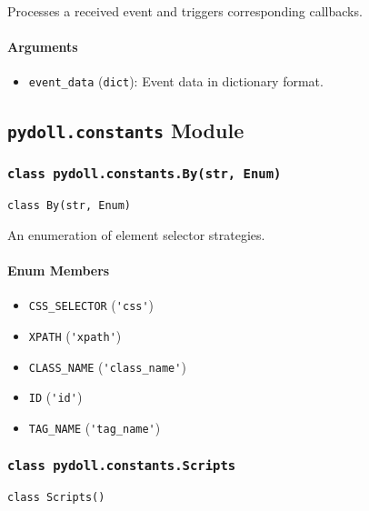 \documentclass{article}
\begin{document}
\noindent Processes a received event and triggers corresponding callbacks.

\paragraph{Arguments}

\begin{itemize}
    \item \lstinline[style=pythonstyle]|event_data| (\lstinline[style=pythonstyle]|dict|): Event data in dictionary format.
\end{itemize}

\hrulefill

\subsection*{\texttt{pydoll.constants} Module}

\subsubsection*{\texttt{class pydoll.constants.By(str, Enum)}}
\noindent\texttt{class By(str, Enum)}

\noindent An enumeration of element selector strategies.

\paragraph{Enum Members}

\begin{itemize}
    \item \lstinline[style=pythonstyle]|CSS_SELECTOR| (\lstinline[style=pythonstyle]|'css'|)
    \item \lstinline[style=pythonstyle]|XPATH| (\lstinline[style=pythonstyle]|'xpath'|)
    \item \lstinline[style=pythonstyle]|CLASS_NAME| (\lstinline[style=pythonstyle]|'class_name'|)
    \item \lstinline[style=pythonstyle]|ID| (\lstinline[style=pythonstyle]|'id'|)
    \item \lstinline[style=pythonstyle]|TAG_NAME| (\lstinline[style=pythonstyle]|'tag_name'|)
\end{itemize}

\subsubsection*{\texttt{class pydoll.constants.Scripts}}
\noindent\texttt{class Scripts()}
\end{document}
